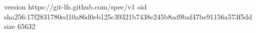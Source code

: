 version https://git-lfs.github.com/spec/v1
oid sha256:17f2831780ed10a86d0eb125c39321b7438e245b8ad9baf47be91156a573f5dd
size 65632
